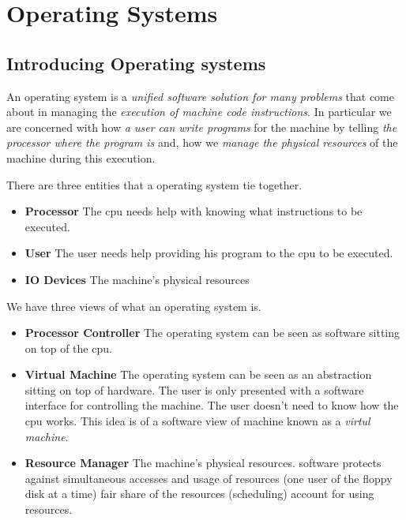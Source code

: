 
\chapter{Operating Systems}


\section{Introducing Operating systems}

An operating system is a \textit{unified software solution for many problems} 
that come about in managing the \textit{execution of machine code instructions}.
In particular we are concerned with how \textit{a user can write programs} for the machine 
by telling \textit{the processor where the program is} and, how we \textit{manage the
physical resources} of the machine during this execution.  

There are three entities that a operating system tie together. 
\begin{itemize}   
\renewcommand{\labelitemi}{$\Box$}
\item \textbf{Processor} 
The cpu needs help with knowing what instructions to be executed.
\item \textbf{User} 
The user needs help providing his program to the cpu to be executed.
\item \textbf{IO Devices} 
The machine's physical resources
\end{itemize}

We have three views of what an operating system is.

\begin{itemize}   
\renewcommand{\labelitemi}{$\Box$}
\item \textbf{Processor Controller} 
The operating system can be seen as software sitting on top of the cpu.
\item \textbf{Virtual Machine} 
The operating system can be seen as an abstraction sitting on top of hardware.
The user is only presented with a software interface for controlling the machine.
The user doesn't need to know how the cpu works. 
This idea is of a software view of machine known as a \textit{virtul machine}.
\item \textbf{Resource Manager} 
The machine's physical resources. software protects against simultaneous accesses
and usage of resources (one user of the ﬂoppy disk at a time)
fair share of the resources (scheduling) account for using resources.
\end{itemize}


